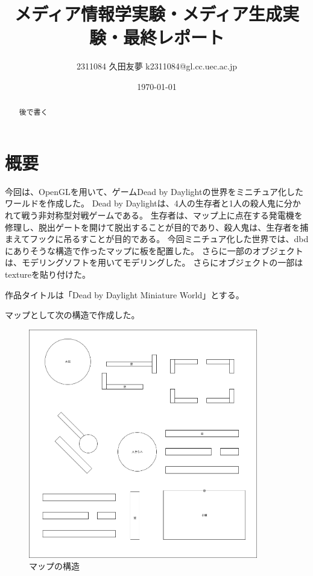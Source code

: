 \documentclass[upIatex,dvipdfmx,a4paper]{jsarticle}
\title{メディア情報学実験・メディア生成実験・最終レポート}
\author{2311084 久田友夢 k2311084@gl.cc.uec.ac.jp}
\date{\today}
\begin{document}
\maketitle

\begin{abstract}
後で書く
\end{abstract}

\tableofcontents
\clearpage

\section{概要}
今回は、OpenGLを用いて、ゲームDead by Daylightの世界をミニチュア化したワールドを作成した。
Dead by Daylightは、4人の生存者と1人の殺人鬼に分かれて戦う非対称型対戦ゲームである。
生存者は、マップ上に点在する発電機を修理し、脱出ゲートを開けて脱出することが目的であり、殺人鬼は、生存者を捕まえてフックに吊るすことが目的である。
今回ミニチュア化した世界では、dbdにありそうな構造で作ったマップに板を配置した。
さらに一部のオブジェクトは、モデリングソフトを用いてモデリングした。
さらにオブジェクトの一部はtextureを貼り付けた。

作品タイトルは「Dead by Daylight Miniature World」とする。

マップとして次の構造で作成した。
\begin{figure}[H]
    \centering
    \includegraphics[width=10cm]{MediaEX_試案.png}
    \caption{マップの構造}
    \label{fig:my_label}
\end{figure}
\end{document}
